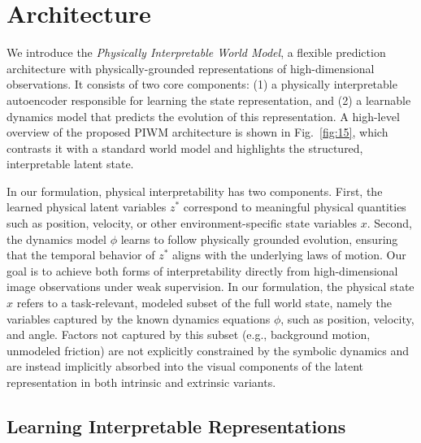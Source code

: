 \documentclass[nonacm,sigconf]{acmart}
\begin{document}


\section{Architecture}\label{sec:architecture}

We introduce the \textit{Physically Interpretable World Model}, a flexible prediction architecture with physically-grounded representations of high-dimensional observations. It consists of two core components: (1) a {physically interpretable autoencoder} responsible for learning the state representation, and (2) a {learnable dynamics model} that predicts the evolution of this representation. A high-level overview of the proposed PIWM architecture is shown in Fig.~\ref{fig:15}, which contrasts it with a standard world model and highlights the structured, interpretable latent state. 

In our formulation, physical interpretability has two components. 
First, the learned physical latent variables $z^*$ correspond to meaningful physical quantities such as position, velocity, or other environment-specific state variables $x$. 
Second, the dynamics model $\phi$ learns to follow physically grounded evolution, ensuring that the temporal behavior of $z^*$ aligns with the underlying laws of motion. 
Our goal is to achieve both forms of interpretability directly from high-dimensional image observations under weak supervision. In our formulation, the physical state $x$ refers to a task-relevant, modeled subset of the full world state, namely the variables captured by the known dynamics equations $\phi$, such as position, velocity, and angle. Factors not captured by this subset (e.g., background motion, unmodeled friction) are not explicitly constrained by the symbolic dynamics and are instead implicitly absorbed into the visual components of the latent representation in both intrinsic and extrinsic variants.

\subsection{Learning Interpretable Representations}
\end{document}

